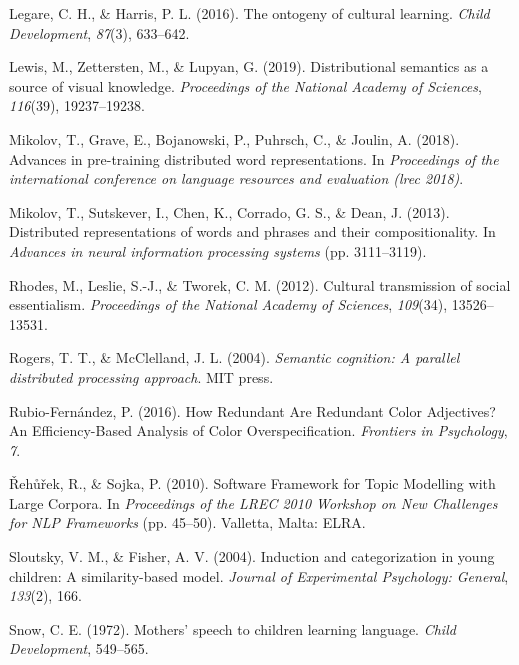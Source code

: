 \documentclass[10pt, letterpaper]{article}
\begin{document}
\leavevmode\hypertarget{ref-legare2016}{}%
Legare, C. H., \& Harris, P. L. (2016). The ontogeny of cultural
learning. \emph{Child Development}, \emph{87}(3), 633--642.

\leavevmode\hypertarget{ref-lewis2019}{}%
Lewis, M., Zettersten, M., \& Lupyan, G. (2019). Distributional
semantics as a source of visual knowledge. \emph{Proceedings of the
National Academy of Sciences}, \emph{116}(39), 19237--19238.

\leavevmode\hypertarget{ref-mikolov2018}{}%
Mikolov, T., Grave, E., Bojanowski, P., Puhrsch, C., \& Joulin, A.
(2018). Advances in pre-training distributed word representations. In
\emph{Proceedings of the international conference on language resources
and evaluation (lrec 2018)}.

\leavevmode\hypertarget{ref-mikolov2013}{}%
Mikolov, T., Sutskever, I., Chen, K., Corrado, G. S., \& Dean, J.
(2013). Distributed representations of words and phrases and their
compositionality. In \emph{Advances in neural information processing
systems} (pp. 3111--3119).

\leavevmode\hypertarget{ref-rhodes2012}{}%
Rhodes, M., Leslie, S.-J., \& Tworek, C. M. (2012). Cultural
transmission of social essentialism. \emph{Proceedings of the National
Academy of Sciences}, \emph{109}(34), 13526--13531.

\leavevmode\hypertarget{ref-rogers2004}{}%
Rogers, T. T., \& McClelland, J. L. (2004). \emph{Semantic cognition: A
parallel distributed processing approach}. MIT press.

\leavevmode\hypertarget{ref-rubio-fernandez2016}{}%
Rubio-Fernández, P. (2016). How Redundant Are Redundant Color
Adjectives? An Efficiency-Based Analysis of Color Overspecification.
\emph{Frontiers in Psychology}, \emph{7}.

\leavevmode\hypertarget{ref-rehurek2010}{}%
Řehůřek, R., \& Sojka, P. (2010). Software Framework for Topic Modelling
with Large Corpora. In \emph{Proceedings of the LREC 2010 Workshop on
New Challenges for NLP Frameworks} (pp. 45--50). Valletta, Malta: ELRA.

\leavevmode\hypertarget{ref-sloutsky2004}{}%
Sloutsky, V. M., \& Fisher, A. V. (2004). Induction and categorization
in young children: A similarity-based model. \emph{Journal of
Experimental Psychology: General}, \emph{133}(2), 166.

\leavevmode\hypertarget{ref-snow1972}{}%
Snow, C. E. (1972). Mothers' speech to children learning language.
\emph{Child Development}, 549--565.
\end{document}
